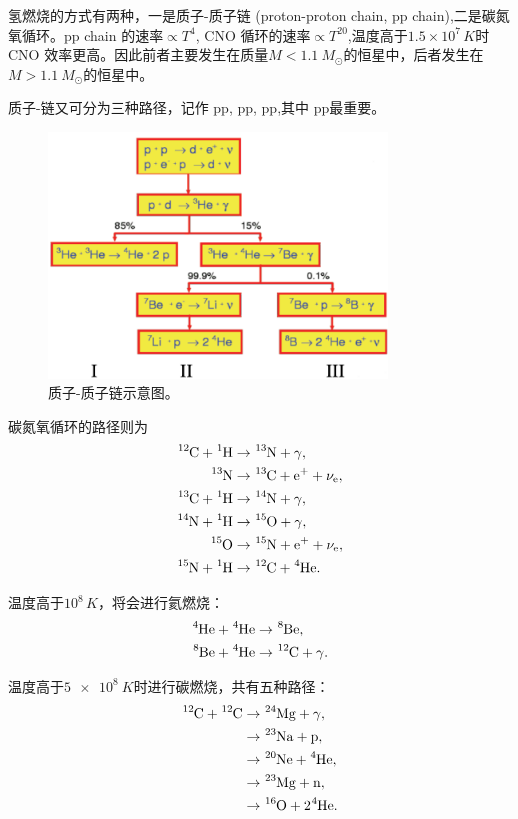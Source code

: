 \documentclass[../天体物理基础.tex]{subfiles}
\begin{document}
氢燃烧的方式有两种，一是质子{}-{}质子链 (proton-proton chain, pp chain),二是碳氮氧循环。pp chain 的速率$\propto T^{4}$, CNO 循环的速率$\propto{}T^{20}$,温度高于$1.5\times10^{7}\,\unit{K}$时 CNO 效率更高。因此前者主要发生在质量$M<\qty{1.1}{M_{\odot}}$的恒星中，后者发生在$M>\qty{1.1}{M_{\odot}}$的恒星中。

质子{}-{}链又可分为三种路径，记作 pp\uppercase\expandafter{}, pp\uppercase\expandafter{}, pp\uppercase\expandafter{},其中 pp\uppercase\expandafter{}最重要。
\begin{figure}[!htbp]
\centering
\includegraphics[width=9cm]{figures/figure2_1.png}
\captionsetup{justification=raggedright, singlelinecheck=false}
\caption{质子{}-{}质子链示意图。}
\label{ppchain}
\end{figure}

碳氮氧循环的路径则为
\begin{align*}
\ce{^{12}C}+\ce{^{1}H}&\to\ce{^{13}N}+\gamma,\\
\ce{^{13}N}&\to\ce{^{13}C}+\ce{e+}+\nu_{\ce{e}},\\
\ce{^{13}C}+\ce{^{1}H}&\to\ce{^{14}N}+\gamma,\\
\ce{^{14}N}+\ce{^{1}H}&\to\ce{^{15}O}+\gamma,\\
\ce{^{15}O}&\to\ce{^{15}N}+\ce{e+}+\nu_{\ce{e}},\\
\ce{^{15}N}+\ce{^{1}H}&\to\ce{^{12}C}+\ce{^{4}He}.
\end{align*}

温度高于$10^{8}\,\unit{K}$，将会进行氦燃烧：
\begin{align*}
\ce{^{4}He}+\ce{^{4}He}&\to\ce{^{8}Be},\\
\ce{^{8}Be}+\ce{^{4}He}&\to\ce{^{12}C}+\gamma.
\end{align*}

温度高于$\qty{5e8}{K}$时进行碳燃烧，共有五种路径：
\begin{align}
\ce{^{12}C}+\ce{^{12}C}&\to\ce{^{24}Mg}+\gamma,\notag\\
&\to\ce{^{23}Na}+\ce{p},\notag\\
&\to\ce{^{20}Ne}+\ce{^{4}He},\notag\\
&\to\ce{^{23}Mg}+\ce{n},\notag\\
&\to\ce{^{16}O}+2\ce{^{4}He}.\notag
\end{align}
\end{document}

